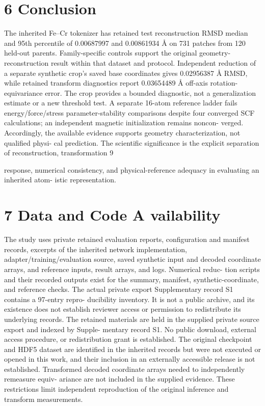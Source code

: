 \documentclass[11pt]{article}
\begin{document}
\section*{6 Conclusion}

The inherited Fe–Cr tokenizer has retained test reconstruction RMSD median and 95th percentile
of 0.00687997 and 0.00861934 Å on 731 patches from 120 held-out parents. Family-specific controls
support the original geometry-reconstruction result within that dataset and protocol. Independent
reduction of a separate synthetic crop’s saved base coordinates gives 0.02956387 Å RMSD, while
retained transform diagnostics report 0.03654489 Å off-axis rotation-equivariance error. The crop
provides a bounded diagnostic, not a generalization estimate or a new threshold test.
A separate 16-atom reference ladder fails energy/force/stress parameter-stability comparisons
despite four converged SCF calculations; an independent magnetic initialization remains noncon-
verged. Accordingly, the available evidence supports geometry characterization, not qualified physi-
cal prediction. The scientific significance is the explicit separation of reconstruction, transformation
9

response, numerical consistency, and physical-reference adequacy in evaluating an inherited atom-
istic representation.

\section*{7 Data and Code A vailability}

The study uses private retained evaluation reports, configuration and manifest records, excerpts of
the inherited network implementation, adapter/training/evaluation source, saved synthetic input
and decoded coordinate arrays, and reference inputs, result arrays, and logs. Numerical reduc-
tion scripts and their recorded outputs exist for the summary, manifest, synthetic-coordinate, and
reference checks. The actual private export Supplementary record S1 contains a 97-entry repro-
ducibility inventory. It is not a public archive, and its existence does not establish reviewer access
or permission to redistribute its underlying records.
The retained materials are held in the supplied private source export and indexed by Supple-
mentary record S1. No public download, external access procedure, or redistribution grant is
established. The original checkpoint and HDF5 dataset are identified in the inherited records but
were not executed or opened in this work, and their inclusion in an externally accessible release is
not established. Transformed decoded coordinate arrays needed to independently remeasure equiv-
ariance are not included in the supplied evidence. These restrictions limit independent reproduction
of the original inference and transform measurements.
\end{document}
